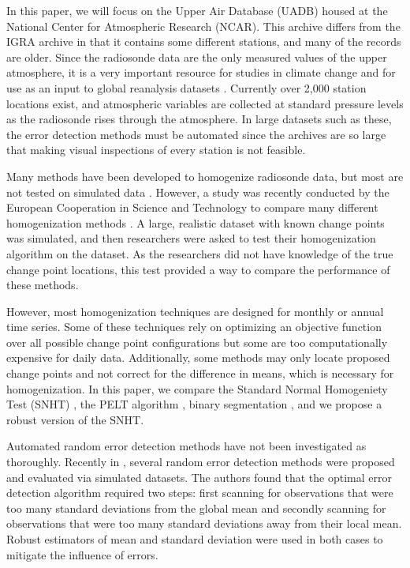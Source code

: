 \documentclass[12pt]{article}
\begin{document}
\begin{doublespacing}
In this paper, we will focus on the Upper Air Database (UADB) housed at the National Center for Atmospheric Research (NCAR). This archive differs from the IGRA archive in that it contains some different stations, and many of the records are older. Since the radiosonde data are the only measured values of the upper atmosphere, it is a very important resource for studies in climate change \cite{elliott91, eskridge95} and for use as an input to global reanalysis datasets \cite{kalnay96, kanamitsu02}. Currently over 2,000 station locations exist, and atmospheric variables are collected at standard pressure levels as the radiosonde rises through the atmosphere. In large datasets such as these, the error detection methods must be automated since the archives are so large that making visual inspections of every station is not feasible.

Many methods have been developed to homogenize radiosonde data, but most are not tested on simulated data \cite{eskridge95,haimberger08,haimberger07,lanzante96,lanzante03,venema12}.  However, a study was recently conducted by the European Cooperation in Science and Technology to compare many different homogenization methods \cite{venema12}.  A large, realistic dataset with known change points was simulated, and then researchers were asked to test their homogenization algorithm on the dataset.  As the researchers did not have knowledge of the true change point locations, this test provided a way to compare the performance of  these  methods.  

However, most homogenization techniques are designed for monthly or annual time series.  Some of these techniques rely on optimizing an objective function over all possible change point configurations \cite{killick12, li14, lu10, scott74} but some are too computationally expensive for daily data.  Additionally, some methods may only locate proposed change points and not correct for the difference in means, which is necessary for homogenization.  In this paper, we compare the Standard Normal Homogeniety Test (SNHT) \cite{alexandersson86}, the PELT algorithm \cite{killick12}, binary segmentation \cite{scott74}, and we propose a robust version of the SNHT.

Automated random error detection methods have not been investigated as thoroughly.  Recently in \cite{bell14}, several random error detection methods were proposed and evaluated via simulated datasets.  The authors found that the optimal error detection algorithm required two steps: first scanning for observations that were too many standard deviations from the global mean and secondly scanning for observations that were too many standard deviations away from their local mean.  Robust estimators of mean and standard deviation were used in both cases to mitigate the influence of errors.


\end{doublespacing}
\end{document}
